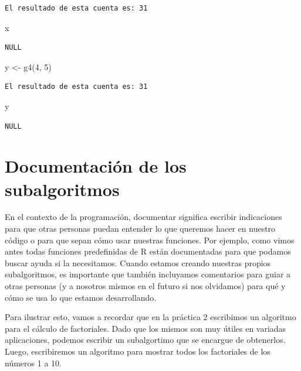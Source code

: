 \documentclass[
]{book}
\newenvironment{Shaded}{\begin{snugshade}}{\end{snugshade}}
\newcommand{\DecValTok}[1]{\textcolor[rgb]{0.00,0.00,0.81}{#1}}
\newcommand{\FunctionTok}[1]{\textcolor[rgb]{0.00,0.00,0.00}{#1}}
\newcommand{\NormalTok}[1]{#1}
\newcommand{\OtherTok}[1]{\textcolor[rgb]{0.56,0.35,0.01}{#1}}
\begin{document}
\begin{verbatim}
El resultado de esta cuenta es: 31
\end{verbatim}

\begin{Shaded}
\begin{Highlighting}[]
\NormalTok{x}
\end{Highlighting}
\end{Shaded}

\begin{verbatim}
NULL
\end{verbatim}

\begin{Shaded}
\begin{Highlighting}[]
\NormalTok{y }\OtherTok{\textless{}{-}} \FunctionTok{g4}\NormalTok{(}\DecValTok{4}\NormalTok{, }\DecValTok{5}\NormalTok{)}
\end{Highlighting}
\end{Shaded}

\begin{verbatim}
El resultado de esta cuenta es: 31
\end{verbatim}

\begin{Shaded}
\begin{Highlighting}[]
\NormalTok{y}
\end{Highlighting}
\end{Shaded}

\begin{verbatim}
NULL
\end{verbatim}

\hypertarget{ejemplofact}{%
\section{Documentación de los subalgoritmos}\label{ejemplofact}}

En el contexto de la programación, documentar significa escribir indicaciones para que otras personas puedan entender lo que queremos hacer en nuestro código o para que sepan cómo usar nuestras funciones. Por ejemplo, como vimos antes todas funciones predefinidas de R están documentadas para que podamos buscar ayuda si la necesitamos. Cuando estamos creando nuestras propios subalgoritmos, es importante que también incluyamos comentarios para guiar a otras personas (y a nosotros mismos en el futuro si nos olvidamos) para qué y cómo se usa lo que estamos desarrollando.

Para ilustrar esto, vamos a recordar que en la práctica 2 escribimos un algoritmo para el cálculo de factoriales. Dado que los mismos son muy útiles en variadas aplicaciones, podemos escribir un subalgortimo que se encargue de obtenerlos. Luego, escribiremos un algoritmo para mostrar todos los factoriales de los números 1 a 10.
\end{document}
